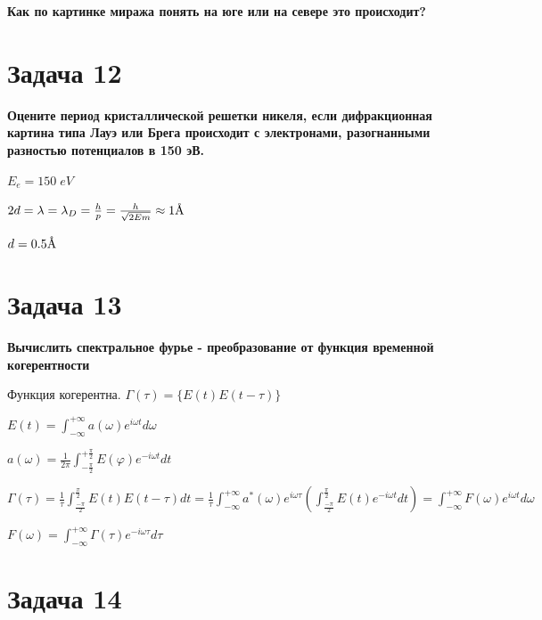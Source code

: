 \documentclass[14pt,a4paper]{article}
\newcommand{\angstrom}{\textup{\AA}}
\begin{document}
    \par \textbf{Как по картинке миража понять на юге или на севере это происходит?}\\
    
    \par 

\section*{Задача 12}
    
    \par \textbf{Оцените период кристаллической решетки никеля, если дифракционная картина типа Лауэ или Брега происходит с электронами, разогнанными разностью потенциалов в 150 эВ.}\\
    
    \par 

    $E_e = 150\; eV$

    $2d = \lambda = \lambda_{D} = \frac{h}{p} = \frac{h}{\sqrt{2Em}} \approx 1 \angstrom$

    $d = 0.5 \angstrom$

\section*{Задача 13}
    
    \par \textbf{Вычислить спектральное фурье - преобразование от функция временной когерентности}\\
    
    \par 

    Функция когерентна. $\Gamma(\tau) = \lbrace E(t) E(t-\tau) \rbrace$

    $E(t) = \int_{-\infty}^{+\infty} a(\omega) e^{i \omega t} d \omega$

    $a(\omega) = \frac{1}{2 \pi} \int_{-\frac{\pi}{2}}^{+\frac{\pi}{2}} E(\varphi) e^{-i \omega t} dt $

    $ \Gamma(\tau) = \frac{1}{\tau} \int_{\frac{-\pi}{2}}^{\frac{\pi}{2}} E(t) E(t-\tau) dt = \frac{1}{\tau} \int_{-\infty}^{+\infty} a^*(\omega) e^{i \omega \tau}
    \left ( \int_{\frac{-\pi}{2}}^{\frac{\pi}{2}} E(t) e^{-i \omega t} dt \right ) = \int_{-\infty}^{+\infty} F(\omega) e^{i \omega t} d \omega$ 

    $F(\omega) = \int_{-\infty}^{+\infty} \Gamma(\tau) e^{-i \omega \tau} d \tau $

\section*{Задача 14}
    
\end{document}
